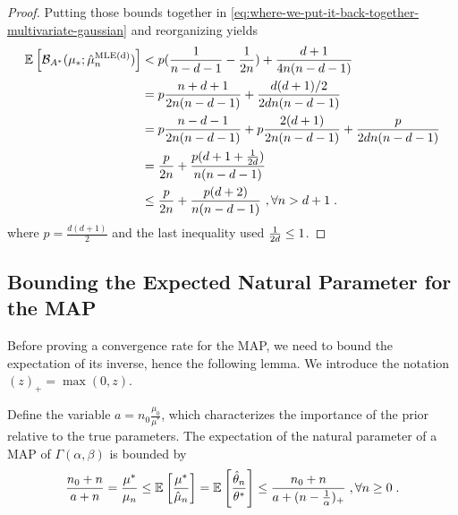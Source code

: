 \begin{subappendices}
\begin{proof}
Putting those bounds together in 
\cref{eq:where-we-put-it-back-together-multivariate-gaussian}
and reorganizing yields
\begin{align}
 	\mathbb{E}_{} \left[ {\mathcal B}_{A^*}( \mu_*; \hat \mu_n^\text{MLE(d)}) \right] 
 	&< p ( \frac{1}{n-d-1} - \frac{1}{2n})  + \frac{d + 1}{4n(n - d - 1)}\\
 	&= p \frac{n + d +1}{2 n (n-d-1)}  + \frac{d(d + 1)/2}{2dn(n - d - 1)}\\
 	&= p\frac{n-d-1}{2n(n-d-1)} + p\frac{2(d+1)}{2 n (n-d-1)} + \frac{p}{2dn (n - d - 1)}\\
 	&= \frac{p}{2n} + \frac{p(d+ 1 + \frac{1}{2d})}{n (n-d-1)} \\
 	&\leq \frac{p}{2n} + \frac{p(d+2)}{n (n - d -1)}
 	\ , \forall n >d+1 \;.
\end{align}
where $p = \frac{d(d+1)}{2}$ and the last inequality used $\frac{1}{2d}\leq 1$. 
\end{proof}

\subsection{Bounding the Expected Natural Parameter for the MAP}
\label{app:nat-bound}
Before proving a convergence rate for the MAP, we need to bound the expectation of its inverse, hence the following lemma.
We introduce the notation $(z)_+ = \max(0,z)$.
\begin{lemma}\label{lem:expected-map-natural-parameter-gaussian}
	Define the variable $a = n_0 \frac{\mu_0}{\mu^*}$, which characterizes 
	the importance of the prior relative to the true parameters.
	The expectation of the natural parameter of a MAP of $\Gamma(\alpha,\beta)$ is bounded by
\begin{equation}
		\frac{n_0+n}{a+n}
		=\frac{\mu^*}{\mu_n}
		\leq \mathbb{E}_{} \left[ \frac{\mu^*}{\hat {\mu}_n} \right]  
		= \mathbb{E}_{} \left[ \frac{\hat {\theta}_n}{\theta^*} \right]  
		\leq
		\frac{n_0 +n}{a+(n-\frac{1}{\alpha} )_+} \; , \forall n\geq 0 \; .
		\label{eq:lemma_nat_bound}
	\end{equation}
\end{lemma}


\end{subappendices}
